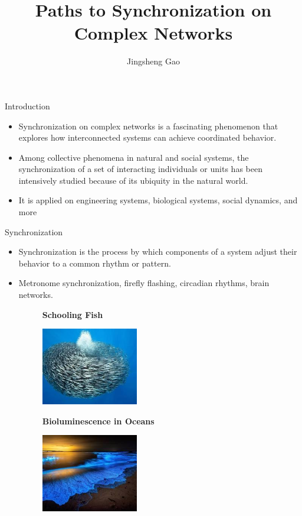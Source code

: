 \documentclass[notheorems, aspectratio=54]{beamer}
\title[Paths to Synchronization on Complex Networks]{Paths to Synchronization on Complex Networks}
\author{Jingsheng Gao}
\institute[AQNU]{garrison.null@gmail.com}
\begin{document}
\begin{frame}
    \titlepage
\end{frame}

\begin{frame}{Introduction}
 \begin{itemize}
    \item Synchronization on complex networks is a fascinating phenomenon that explores how interconnected systems can achieve coordinated behavior.
    \item Among collective phenomena in natural and social systems, the synchronization of a set of interacting individuals or units has been intensively studied because of its ubiquity in the natural world.
    \item It is applied on engineering systems, biological systems, social dynamics, and more
  \end{itemize}
\end{frame}

\begin{frame}{Synchronization}
  \begin{figure}
    \centering
  \end{figure}
  \begin{itemize}
    \item Synchronization is the process by which components of a system adjust their behavior to a common rhythm or pattern.
    \item Metronome synchronization, firefly flashing, circadian rhythms, brain networks.
\begin{figure}
  \begin{minipage}[b]{0.45\textwidth}
    \textbf{Schooling Fish}\par\medskip
    \includegraphics[width=0.4\textwidth]{schooling_fish.png}
  \end{minipage}
  \hfill
  \begin{minipage}[b]{0.45\textwidth}
    \textbf{Bioluminescence in Oceans}\par\medskip
    \includegraphics[width=0.4\textwidth]{bioluminescence.png}
  \end{minipage}
\end{figure}
  \end{itemize}
\end{frame}
\end{document}
